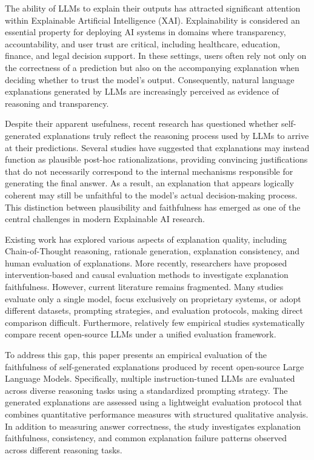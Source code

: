 \documentclass{article}
\begin{document}
The ability of LLMs to explain their outputs has attracted significant attention within Explainable Artificial Intelligence (XAI). Explainability is considered an essential property for deploying AI systems in domains where transparency, accountability, and user trust are critical, including healthcare, education, finance, and legal decision support. In these settings, users often rely not only on the correctness of a prediction but also on the accompanying explanation when deciding whether to trust the model's output. Consequently, natural language explanations generated by LLMs are increasingly perceived as evidence of reasoning and transparency.

Despite their apparent usefulness, recent research has questioned whether self-generated explanations truly reflect the reasoning process used by LLMs to arrive at their predictions. Several studies have suggested that explanations may instead function as plausible post-hoc rationalizations, providing convincing justifications that do not necessarily correspond to the internal mechanisms responsible for generating the final answer. As a result, an explanation that appears logically coherent may still be unfaithful to the model's actual decision-making process. This distinction between plausibility and faithfulness has emerged as one of the central challenges in modern Explainable AI research.

Existing work has explored various aspects of explanation quality, including Chain-of-Thought reasoning, rationale generation, explanation consistency, and human evaluation of explanations. More recently, researchers have proposed intervention-based and causal evaluation methods to investigate explanation faithfulness. However, current literature remains fragmented. Many studies evaluate only a single model, focus exclusively on proprietary systems, or adopt different datasets, prompting strategies, and evaluation protocols, making direct comparison difficult. Furthermore, relatively few empirical studies systematically compare recent open-source LLMs under a unified evaluation framework.

To address this gap, this paper presents an empirical evaluation of the faithfulness of self-generated explanations produced by recent open-source Large Language Models. Specifically, multiple instruction-tuned LLMs are evaluated across diverse reasoning tasks using a standardized prompting strategy. The generated explanations are assessed using a lightweight evaluation protocol that combines quantitative performance measures with structured qualitative analysis. In addition to measuring answer correctness, the study investigates explanation faithfulness, consistency, and common explanation failure patterns observed across different reasoning tasks.
\end{document}
